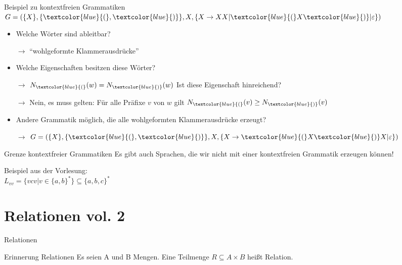 \documentclass[handout]{beamer}
\begin{document}
\begin{frame}{Beispiel zu kontextfreien Grammatiken}
	$G= (\{X\}, \{\textcolor{blue}{(}, \textcolor{blue}{)}\}, X, \{X \rightarrow XX|\textcolor{blue}{(} X \textcolor{blue}{)}| \varepsilon\} )$
	\begin{itemize}
		\item Welche Wörter sind ableitbar?
		\pause
		\item[$\rightarrow$] ``wohlgeformte Klammerausdrücke''
		\pause
		\item Welche Eigenschaften besitzen diese Wörter?
		\pause
		\item[$\rightarrow$]$N_{\textcolor{blue}{(}}(w) = N_{\textcolor{blue}{)}}(w)$ \pause Ist diese Eigenschaft hinreichend?
		\pause
		\item[$\rightarrow$]Nein, es muss gelten: Für alle Präfixe $v$ von $w$ gilt $ N_{\textcolor{blue}{(}}(v) \geq N_{\textcolor{blue}{)}}(v)$
		\pause
		\item Andere Grammatik möglich, die alle wohlgeformten Klammerausdrücke erzeugt?
		\pause
		\item[$\rightarrow$]  $G= (\{X\}, \{\textcolor{blue}{(}, \textcolor{blue}{)}\}, X, \{X \rightarrow \textcolor{blue}{(} X \textcolor{blue}{)}X| \varepsilon\} )$
	\end{itemize}
\end{frame}

\begin{frame}{Grenze kontextfreier Grammatiken}
	Es gibt auch Sprachen, die wir nicht mit einer kontextfreien Grammatik erzeugen können!
	
	\vspace{.3cm} \bp
	Beispiel aus der Vorlesung:\\
	$L_{vv} = \{vcv| v \in \{a,b\}^*\} \subseteq \{a, b, c\}^*$
\end{frame}


\section{Relationen vol. 2}
\begin{frame}{Relationen}
	\pause
	\begin{block}{Erinnerung Relationen}
		Es seien A und B Mengen. Eine Teilmenge $R \subseteq A \times B$ heißt Relation.
	\end{block}
\end{frame}
\end{document}
